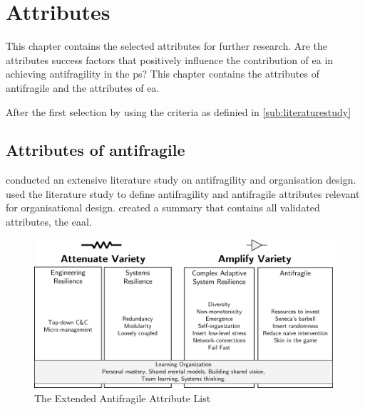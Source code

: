 \chapter{Attributes}
\label{ch:attributes}
This chapter contains the selected \glspl{attribute} for further research. Are the \glspl{attribute} success factors that positively influence the contribution of \acrlong{ea} in achieving \gls{antifragility} in the \gls{ps}? This chapter contains the attributes of \gls{antifragile} and the attributes of \acrlong{ea}. 

After the first selection by using the criteria as definied in \cref{sub:literaturestudy}
\section{Attributes of antifragile}
\label{sec:attributesofantifragile}
\label{sec:attributesantifragile}
\label{sub:attributeseaal}
\textcites{Botjes2020}{Botjes2021} conducted an extensive literature study on \gls{antifragility} and organisation design. \textcites{Botjes2020}{Botjes2021} used the literature study to define \gls{antifragility} and \gls{antifragile} \glspl{attribute} relevant for organisational design. \textcite[Fig.~8]{Botjes2021} created a summary that contains all validated attributes, the \acrlong{eaal}.
\begin{figure}[H]
	\centering
	\includegraphics[width=0.8\linewidth]{images/eaalbw}
	\caption[The Extended Antifragile Attribute List \parencite{Botjes2021}]{The Extended Antifragile Attribute List \parencite{Botjes2021}}
	\label{fig:eaalbw2}
\end{figure}
